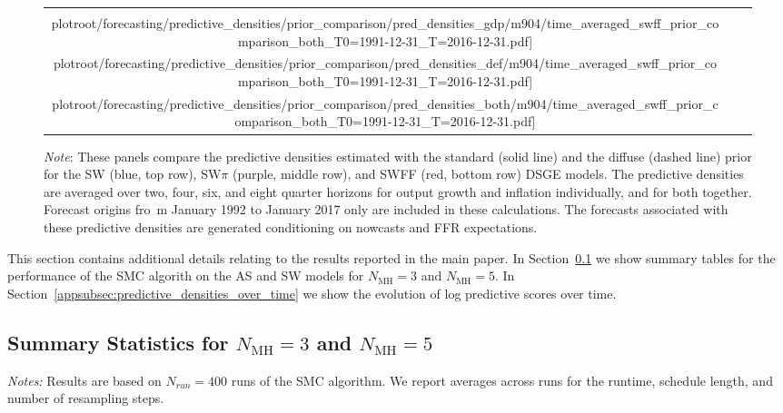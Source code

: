 \documentclass[12pt]{article}
\theoremstyle{definition}
\newcommand\plotroot{../figures_for_paper}
\begin{document}
\begin{figure}[H]
\begin{tabular}{@{\hspace*{-.4cm}}ccc}
        \texttt{[image: \\plotroot/forecasting/predictive\_densities/prior\_comparison/pred\_densities\_gdp/m904/time\_averaged\_swff\_prior\_comparison\_both\_T0=1991-12-31\_T=2016-12-31.pdf]} &
        \texttt{[image: \\plotroot/forecasting/predictive\_densities/prior\_comparison/pred\_densities\_def/m904/time\_averaged\_swff\_prior\_comparison\_both\_T0=1991-12-31\_T=2016-12-31.pdf]} &
        \texttt{[image: \\plotroot/forecasting/predictive\_densities/prior\_comparison/pred\_densities\_both/m904/time\_averaged\_swff\_prior\_comparison\_both\_T0=1991-12-31\_T=2016-12-31.pdf]} \\[-.5ex]
    \end{tabular}
    \begin{minipage}{\textwidth}
        \scriptsize
        \setlength{\baselineskip}{2mm}
        \emph{Note}: These panels compare the predictive densities estimated with the standard   (solid line) and the diffuse  (dashed line) prior for the SW (blue, top row), SW$\pi$ (purple, middle row), and SWFF (red, bottom row) DSGE models. The predictive densities are averaged over two, four, six, and eight quarter horizons for output growth and inflation individually, and for both together. Forecast origins fro\
m January 1992 to January 2017 only are included in these calculations. The forecasts associated with these predictive densities are generated conditioning on nowcasts and FFR expectations.
    \end{minipage}
\end{figure}

This section contains additional details relating to the results reported in the main paper. In Section~\ref{appsubsec:mh35} we show summary tables for the performance of the SMC algorith on the AS and SW models for $N_\text{MH}=3$ and $N_\text{MH}=5$. In Section~\ref{appsubsec:predictive_densities_over_time} we show the evolution of log predictive scores over time. 

\subsection{Summary Statistics for $N_\text{MH}=3$ and $N_\text{MH}=5$}

\label{appsubsec:mh35}
\begin{table}[H]
	\caption{AS Model: 3 MH Steps Per Mutation}
	\label{appsubsec:as.smcsummary}
	\begin{center}
		
	\end{center}
	{\footnotesize {\em Notes:} Results are based on $N_{run} = 400$ runs of the SMC algorithm. We report averages across runs for the runtime, schedule length, and number of resampling steps.}\setlength{\baselineskip}{4mm}
\end{table}
\end{document}
